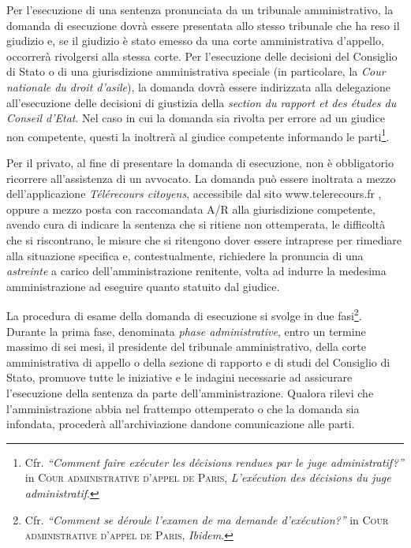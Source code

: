\documentclass[12pt,it,a4paper,]{report}
\begin{document}
Per l'esecuzione di una sentenza pronunciata da un tribunale
amministrativo, la domanda di esecuzione dovrà essere presentata allo
stesso tribunale che ha reso il giudizio e, se il giudizio è stato
emesso da una corte amministrativa d'appello, occorrerà rivolgersi alla
stessa corte. Per l'esecuzione delle decisioni del Consiglio di Stato o
di una giurisdizione amministrativa speciale (in particolare, la
\emph{Cour nationale du droit d'asile}), la domanda dovrà essere
indirizzata alla delegazione all'esecuzione delle decisioni di giustizia
della \emph{section du rapport et des études du Conseil d'Etat}. Nel
caso in cui la domanda sia rivolta per errore ad un giudice non
competente, questi la inoltrerà al giudice competente informando le
parti\footnote{Cfr. \emph{``Comment faire exécuter les décisions rendues
  par le juge administratif?''} in \textsc{Cour administrative d'appel
  de Paris}, \emph{L'exécution des décisions du juge administratif}.}.

Per il privato, al fine di presentare la domanda di esecuzione, non è
obbligatorio ricorrere all'assistenza di un avvocato. La domanda può
essere inoltrata a mezzo dell'applicazione \emph{Télérecours citoyens},
accessibile dal sito www.telerecours.fr , oppure a mezzo posta con
raccomandata A/R alla giurisdizione competente, avendo cura di indicare
la sentenza che si ritiene non ottemperata, le difficoltà che si
riscontrano, le misure che si ritengono dover essere intraprese per
rimediare alla situazione specifica e, contestualmente, richiedere la
pronuncia di una \emph{astreinte} a carico dell'amministrazione
renitente, volta ad indurre la medesima amministrazione ad eseguire
quanto statuito dal giudice.

La procedura di esame della domanda di esecuzione si svolge in due
fasi\footnote{Cfr. \emph{``Comment se déroule l'examen de ma demande
  d'exécution?''} in \textsc{Cour administrative d'appel de Paris},
  \emph{Ibidem}.}. Durante la prima fase, denominata \emph{phase
administrative}, entro un termine massimo di sei mesi, il presidente del
tribunale amministrativo, della corte amministrativa di appello o della
sezione di rapporto e di studi del Consiglio di Stato, promuove tutte le
iniziative e le indagini necessarie ad assicurare l'esecuzione della
sentenza da parte dell'amministrazione. Qualora rilevi che
l'amministrazione abbia nel frattempo ottemperato o che la domanda sia
infondata, procederà all'archiviazione dandone comunicazione alle parti.
\end{document}
